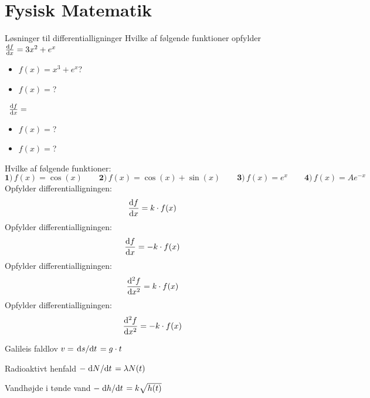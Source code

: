 \documentclass[crop=false, class=memoir]{standalone}
\begin{document}
\section{Fysisk Matematik}

\begin{opgave}[1]{Løsninger til differentialligninger}
Hvilke af følgende funktioner opfylder
\opg\ $\dv{f}{x} = 3x^2 + e^x$
\begin{itemize}
    \item $f(x) = x^3 + e^x$?
    \item $f(x) = $?
\end{itemize}
\opg\ $\dv{f}{x} = $
\begin{itemize}
    \item $f(x) = $?
    \item $f(x) = $?
\end{itemize}
\end{opgave}

\begin{opgave}{}
Hvilke af følgende funktioner:
\begin{equation}
    \textbf{1)}\, f(x) = \cos(x)\qquad \textbf{2)}\, f(x) = \cos(x) + \sin(x)\qquad \textbf{3)}\, f(x) = e^x\qquad \textbf{4)}\, f(x) = Ae^{-x}
\end{equation}
\opg Opfylder differentialligningen:
\begin{equation*}
    \dv{f}{x} = k\cdot f(x)
\end{equation*}
\opg Opfylder differentialligningen:
\begin{equation*}
    \dv{f}{x} = -k\cdot f(x)
\end{equation*}
\opg Opfylder differentialligningen:
\begin{equation*}
    \dv[2]{f}{x} = k\cdot f(x)
\end{equation*}
\opg Opfylder differentialligningen:
\begin{equation*}
    \dv[2]{f}{x} = -k\cdot f(x)
\end{equation*}
\end{opgave}

\begin{opgave}[1]{Galileis faldlov}
$v = \dv*{s}{t} = g \cdot t$
\end{opgave}

\begin{opgave}[1]{Radioaktivt henfald}
$-\dv*{N}{t} = \lambda N(t)$
\end{opgave}

\begin{opgave}[1]{Vandhøjde i tønde}
vand $-\dv*{h}{t} = k\sqrt{h(t)}$
\end{opgave}
\end{document}
